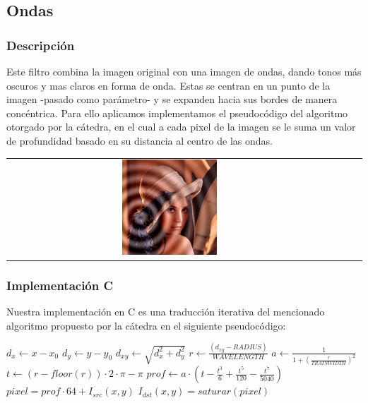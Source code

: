 \subsection{Ondas}

\subsubsection{Descripción}

\begin{multicols}{2}
  Este filtro combina la imagen original con una imagen de ondas, dando tonos más oscuros y mas claros en forma de onda. Estas se centran en un punto de la imagen -pasado como parámetro- y se expanden hacia sus bordes de manera concéntrica. Para ello aplicamos implementamos el pseudocódigo del algoritmo otorgado por la cátedra, en el cual a cada pixel de la imagen se le suma un valor de profundidad basado en su distancia al centro de las ondas.
  \begin{center}
    \begin{tabular}{cccc}
      \includegraphics[width=0.3\textwidth]{imagenes/lenaONDA.jpg} \\
    \end{tabular}
     \end{center}
  \end{multicols}

\subsubsection{Implementación C}

Nuestra implementación en C es una traducción iterativa del mencionado algoritmo propuesto por la cátedra en el siguiente pseudocódigo:

\begin{algorithm}[H]
  \begin{algorithmic}[1]
      \STATE $d_x \gets x - x_0$
      \STATE
      \STATE $d_y \gets y - y_0$
      \STATE
      \STATE $d_{xy} \gets \sqrt{d_{x}^2+d_{y}^2}$
      \STATE
      \STATE $r \gets \frac{(d_{xy} - RADIUS)}{WAVELENGTH}$
      \STATE
      \STATE $a \gets \frac{1}{1 + (\frac{r}{TRAINWIDTH})^2 }$
      \STATE
      \STATE $t \gets ( r-floor(r) ) \cdot 2 \cdot \pi - \pi$
      \STATE
      \STATE $prof \gets a \cdot (t - \frac{t^3}{6}+\frac{t^5}{120}-\frac{t^7}{5040})$
      \STATE
      \STATE $pixel = prof \cdot 64 + I_{src}(x, y)$    
      \STATE
      \STATE $I_{dst}(x, y) = saturar(pixel)$
    \ENDFOR
  \end{algorithmic}
  \caption{$ondas (I_{src}, I_{dst}, x_0, y_0)$}
  \label{alg:ondas}
\end{algorithm}

